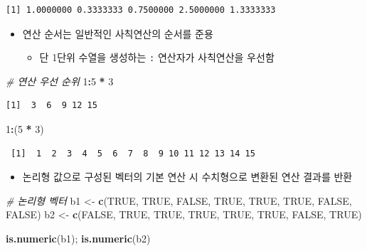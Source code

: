 \documentclass[
  11pt,
]{krantz}
\newenvironment{Shaded}{\begin{snugshade}}{\end{snugshade}}
\newcommand{\CommentTok}[1]{\textcolor[rgb]{0.37,0.37,0.37}{\textit{#1}}}
\newcommand{\DecValTok}[1]{\textcolor[rgb]{0.06,0.06,0.06}{#1}}
\newcommand{\KeywordTok}[1]{\textcolor[rgb]{0.27,0.27,0.27}{\textbf{#1}}}
\newcommand{\NormalTok}[1]{#1}
\newcommand{\OperatorTok}[1]{\textcolor[rgb]{0.43,0.43,0.43}{\textbf{#1}}}
\newcommand{\OtherTok}[1]{\textcolor[rgb]{0.37,0.37,0.37}{#1}}
\newcommand{\StringTok}[1]{\textcolor[rgb]{0.5,0.5,0.5}{#1}}
\providecommand{\tightlist}{%
  \setlength{\itemsep}{0pt}\setlength{\parskip}{0pt}}
\begin{document}
\begin{verbatim}
[1] 1.0000000 0.3333333 0.7500000 2.5000000 1.3333333
\end{verbatim}

\normalsize

\begin{itemize}
\tightlist
\item
  연산 순서는 일반적인 사칙연산의 순서를 준용

  \begin{itemize}
  \tightlist
  \item
    단 1단위 수열을 생성하는 \texttt{:} 연산자가 사칙연산을 우선함
  \end{itemize}
\end{itemize}

\footnotesize

\begin{Shaded}
\begin{Highlighting}[]
\CommentTok{# 연산 우선 순위}
\DecValTok{1}\OperatorTok{:}\DecValTok{5} \OperatorTok{*}\StringTok{ }\DecValTok{3}
\end{Highlighting}
\end{Shaded}

\begin{verbatim}
[1]  3  6  9 12 15
\end{verbatim}

\begin{Shaded}
\begin{Highlighting}[]
\DecValTok{1}\OperatorTok{:}\NormalTok{(}\DecValTok{5} \OperatorTok{*}\StringTok{ }\DecValTok{3}\NormalTok{)}
\end{Highlighting}
\end{Shaded}

\begin{verbatim}
 [1]  1  2  3  4  5  6  7  8  9 10 11 12 13 14 15
\end{verbatim}

\normalsize

\begin{itemize}
\tightlist
\item
  논리형 값으로 구성된 벡터의 기본 연산 시 수치형으로 변환된 연산 결과를 반환
\end{itemize}

\footnotesize

\begin{Shaded}
\begin{Highlighting}[]
\CommentTok{# 논리형 벡터}
\NormalTok{b1 <-}\StringTok{ }\KeywordTok{c}\NormalTok{(}\OtherTok{TRUE}\NormalTok{, }\OtherTok{TRUE}\NormalTok{, }\OtherTok{FALSE}\NormalTok{, }\OtherTok{TRUE}\NormalTok{, }\OtherTok{TRUE}\NormalTok{, }\OtherTok{TRUE}\NormalTok{, }\OtherTok{FALSE}\NormalTok{, }\OtherTok{FALSE}\NormalTok{)}
\NormalTok{b2 <-}\StringTok{ }\KeywordTok{c}\NormalTok{(}\OtherTok{FALSE}\NormalTok{, }\OtherTok{TRUE}\NormalTok{, }\OtherTok{TRUE}\NormalTok{, }\OtherTok{TRUE}\NormalTok{, }\OtherTok{TRUE}\NormalTok{, }\OtherTok{TRUE}\NormalTok{, }\OtherTok{FALSE}\NormalTok{, }\OtherTok{TRUE}\NormalTok{)}

\KeywordTok{is.numeric}\NormalTok{(b1); }\KeywordTok{is.numeric}\NormalTok{(b2)}
\end{Highlighting}
\end{Shaded}
\end{document}
